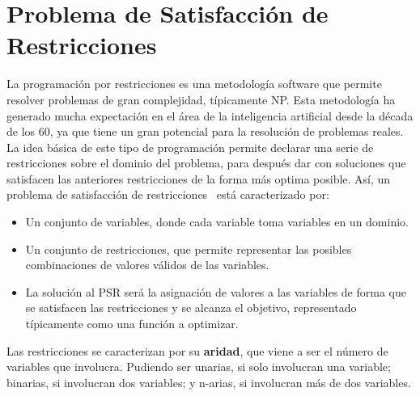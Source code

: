 \section{Problema de Satisfacción de Restricciones}
La programación por restricciones es una metodología software que permite resolver problemas de gran complejidad, típicamente NP. Esta metodología ha generado mucha expectación en el área de la inteligencia artificial desde la década de los 60, ya que tiene un gran potencial para la resolución de problemas reales. La idea básica de este tipo de programación permite declarar una serie de restricciones sobre el dominio del problema, para después dar con soluciones que satisfacen las anteriores restricciones de la forma más optima posible. Así, un problema de satisfacción de restricciones~\cite{Russ06} está caracterizado por:
\begin{itemize}
	\item Un conjunto de variables, donde cada variable toma variables en un dominio.
	\item Un conjunto de restricciones, que permite representar las posibles combinaciones de valores válidos de las variables.
	\item La solución al \gls{PSR} será la asignación de valores a las variables de forma que se satisfacen las restricciones y se alcanza el objetivo, representado típicamente como una función a optimizar.
\end{itemize}
Las restricciones se caracterizan por su \textbf{aridad}, que viene a ser el número de variables que involucra. Pudiendo ser unarias, si solo involucran una variable; binarias, si involucran dos variables; y n-arias, si involucran más de dos variables.\\
